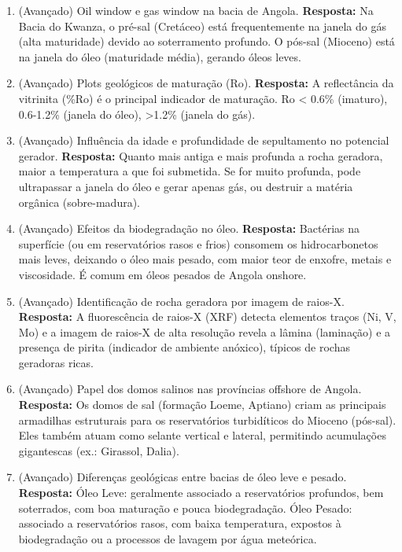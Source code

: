 \documentclass[11pt,a4paper]{article}
\begin{document}
\begin{enumerate}
  \item (Avançado) Oil window e gas window na bacia de Angola.
  \textbf{Resposta:} Na Bacia do Kwanza, o pré-sal (Cretáceo) está frequentemente na janela do gás (alta maturidade) devido ao soterramento profundo. O pós-sal (Mioceno) está na janela do óleo (maturidade média), gerando óleos leves.

  \item (Avançado) Plots geológicos de maturação (Ro).
  \textbf{Resposta:} A reflectância da vitrinita (\%Ro) é o principal indicador de maturação. Ro < 0.6\% (imaturo), 0.6-1.2\% (janela do óleo), >1.2\% (janela do gás).

  \item (Avançado) Influência da idade e profundidade de sepultamento no potencial gerador.
  \textbf{Resposta:} Quanto mais antiga e mais profunda a rocha geradora, maior a temperatura a que foi submetida. Se for muito profunda, pode ultrapassar a janela do óleo e gerar apenas gás, ou destruir a matéria orgânica (sobre-madura).

  \item (Avançado) Efeitos da biodegradação no óleo.
  \textbf{Resposta:} Bactérias na superfície (ou em reservatórios rasos e frios) consomem os hidrocarbonetos mais leves, deixando o óleo mais pesado, com maior teor de enxofre, metais e viscosidade. É comum em óleos pesados de Angola onshore.

  \item (Avançado) Identificação de rocha geradora por imagem de raios-X.
  \textbf{Resposta:} A fluorescência de raios-X (XRF) detecta elementos traços (Ni, V, Mo) e a imagem de raios-X de alta resolução revela a lâmina (laminação) e a presença de pirita (indicador de ambiente anóxico), típicos de rochas geradoras ricas.

  \item (Avançado) Papel dos domos salinos nas províncias offshore de Angola.
  \textbf{Resposta:} Os domos de sal (formação Loeme, Aptiano) criam as principais armadilhas estruturais para os reservatórios turbidíticos do Mioceno (pós-sal). Eles também atuam como selante vertical e lateral, permitindo acumulações gigantescas (ex.: Girassol, Dalia).

  \item (Avançado) Diferenças geológicas entre bacias de óleo leve e pesado.
  \textbf{Resposta:} Óleo Leve: geralmente associado a reservatórios profundos, bem soterrados, com boa maturação e pouca biodegradação. Óleo Pesado: associado a reservatórios rasos, com baixa temperatura, expostos à biodegradação ou a processos de lavagem por água meteórica.


\end{enumerate}
\end{document}
